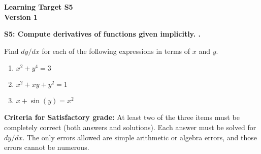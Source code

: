 \documentclass[10pt]{article}
\begin{document}
	\vspace*{0in}

		\begin{center}
			\textbf{Learning Target S5 \\
			Version 1} 
		\end{center}


\begin{framed}
	\textbf{S5: Compute derivatives of functions given implicitly.
.}
\end{framed}

Find $dy/dx$ for each of the following expressions in terms of $x$ and $y$. 

\begin{enumerate}
    \item $x^2 + y^4 = 3$
    \item $x^2 + xy + y^2 = 1$
    \item $x + \sin(y) = x^2$
\end{enumerate}

\vfill


\begin{small}
    \begin{framed}
        	\textbf{Criteria for Satisfactory grade:} At least two of the three items must be completely correct (both answers and solutions). Each answer must be solved for $dy/dx$. The only errors allowed are simple arithmetic or algebra errors, and those errors cannot be numerous.
    \end{framed}

\end{small}
\end{document}

